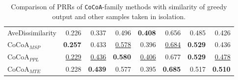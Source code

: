 \begin{table*}[h!]
\begin{tabular}{lrrrrrrr}
AveDissimilarity & 0.226& 0.337& 0.496& \textbf{0.408}& 0.656& 0.485& 0.426\\
$\text{CoCoA}_{MSP}$ & \textbf{0.257}& 0.433& \underline{0.578}& 0.396& \underline{0.684}& \textbf{0.529}& 0.436\\
$\text{CoCoA}_{PPL}$ & \underline{0.229}& \underline{0.436}& \textbf{0.580}& \underline{0.406}& 0.677& \textbf{0.529}& \underline{0.478}\\
$\text{CoCoA}_{MTE}$ & 0.228& \textbf{0.439}& 0.577& 0.395& \textbf{0.685}& 0.517& \textbf{0.510}\\
\bottomrule

\end{tabular}
\caption{Comparison of PRRs of \texttt{CoCoA}-family methods with similarity of greedy output and other samples taken in isolation.}
\label{tab:ablation_dissim_greedy}
\end{table*}

